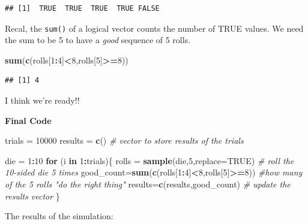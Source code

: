 \documentclass[
]{book}
\newenvironment{Shaded}{\begin{snugshade}}{\end{snugshade}}
\newcommand{\AttributeTok}[1]{\textcolor[rgb]{0.13,0.29,0.53}{#1}}
\newcommand{\CommentTok}[1]{\textcolor[rgb]{0.56,0.35,0.01}{\textit{#1}}}
\newcommand{\ConstantTok}[1]{\textcolor[rgb]{0.56,0.35,0.01}{#1}}
\newcommand{\ControlFlowTok}[1]{\textcolor[rgb]{0.13,0.29,0.53}{\textbf{#1}}}
\newcommand{\DecValTok}[1]{\textcolor[rgb]{0.00,0.00,0.81}{#1}}
\newcommand{\FunctionTok}[1]{\textcolor[rgb]{0.13,0.29,0.53}{\textbf{#1}}}
\newcommand{\NormalTok}[1]{#1}
\newcommand{\OtherTok}[1]{\textcolor[rgb]{0.56,0.35,0.01}{#1}}
\newcommand{\SpecialCharTok}[1]{\textcolor[rgb]{0.81,0.36,0.00}{\textbf{#1}}}
\theoremstyle{definition}
\theoremstyle{definition}
\theoremstyle{definition}
\theoremstyle{definition}
\theoremstyle{remark}
\begin{document}
\begin{verbatim}
## [1]  TRUE  TRUE  TRUE  TRUE FALSE
\end{verbatim}

Recal, the \texttt{sum()} of a logical vector counts the number of TRUE values. We need the sum to be 5 to have a \emph{good} sequence of 5 rolls.

\begin{Shaded}
\begin{Highlighting}[]
\FunctionTok{sum}\NormalTok{(}\FunctionTok{c}\NormalTok{(rolls[}\DecValTok{1}\SpecialCharTok{:}\DecValTok{4}\NormalTok{]}\SpecialCharTok{\textless{}}\DecValTok{8}\NormalTok{,rolls[}\DecValTok{5}\NormalTok{]}\SpecialCharTok{\textgreater{}=}\DecValTok{8}\NormalTok{))}
\end{Highlighting}
\end{Shaded}

\begin{verbatim}
## [1] 4
\end{verbatim}

I think we're ready!!

\textbf{Final Code}

\begin{Shaded}
\begin{Highlighting}[]
\NormalTok{trials }\OtherTok{=} \DecValTok{10000}
\NormalTok{results }\OtherTok{=} \FunctionTok{c}\NormalTok{() }\CommentTok{\# vector to store results of the trials}

\NormalTok{die }\OtherTok{=} \DecValTok{1}\SpecialCharTok{:}\DecValTok{10}
\ControlFlowTok{for}\NormalTok{ (i }\ControlFlowTok{in} \DecValTok{1}\SpecialCharTok{:}\NormalTok{trials)\{}
\NormalTok{  rolls }\OtherTok{=} \FunctionTok{sample}\NormalTok{(die,}\DecValTok{5}\NormalTok{,}\AttributeTok{replace=}\ConstantTok{TRUE}\NormalTok{) }\CommentTok{\# roll the 10{-}sided die 5 times}
\NormalTok{  good\_count}\OtherTok{=}\FunctionTok{sum}\NormalTok{(}\FunctionTok{c}\NormalTok{(rolls[}\DecValTok{1}\SpecialCharTok{:}\DecValTok{4}\NormalTok{]}\SpecialCharTok{\textless{}}\DecValTok{8}\NormalTok{,rolls[}\DecValTok{5}\NormalTok{]}\SpecialCharTok{\textgreater{}=}\DecValTok{8}\NormalTok{)) }\CommentTok{\#how many of the 5 rolls "do the right thing"}
\NormalTok{  results}\OtherTok{=}\FunctionTok{c}\NormalTok{(results,good\_count) }\CommentTok{\# update the results vector}
\NormalTok{\}}
\end{Highlighting}
\end{Shaded}

The results of the simulation:
\end{document}
